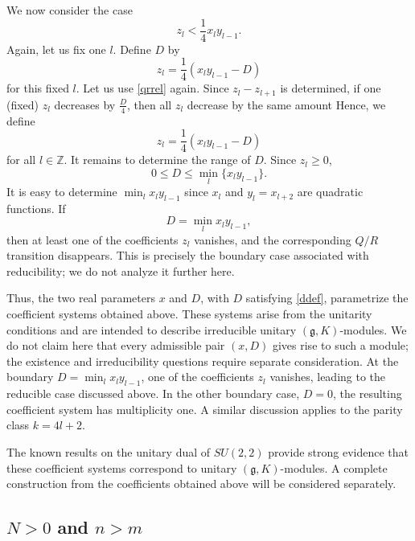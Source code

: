 \documentclass[twoside,a4paper,12pt]{article}
\newcommand{\g}{\ensuremath{\mathfrak g}}
\newcommand{\Z}{\ensuremath{\mathbb Z}}
\theoremstyle{definition}
\begin{document}
We now consider the case
\begin{equation*}
	z_l<\frac14x_ly_{l-1}.
\end{equation*}
Again, let us fix one $l$. Define $D$ by
\begin{equation*}
	z_l=\frac14\left(x_ly_{l-1}-D\right)
\end{equation*}
for this fixed $l$. Let us use \eqref{qrrel} again. Since $z_l-z_{l+1}$ is
determined, if one (fixed) $z_l$ decreases by $\frac D4$, then all $z_l$
decrease by the same amount Hence, we define
\begin{equation*}
	z_l=\frac14\left(x_ly_{l-1}-D\right)
\end{equation*}
for all $l\in\Z$. It remains to determine the range of $D$. Since $z_l\geq0$,
\begin{equation}\label{ddef}
	0\leq D\leq\min_l\{x_ly_{l-1}\}.
\end{equation}
It is easy to determine $\min_l{x_ly_{l-1}}$ since $x_l$ and
$y_l=x_{l+2}$ are quadratic functions. If
\[ D=\min_l{x_ly_{l-1}}, \]
then at least one of the coefficients $z_l$ vanishes, and the corresponding
$Q/R$ transition disappears. This is precisely the boundary case associated
with reducibility; we do not analyze it further here.

Thus, the two real parameters $x$ and $D$, with $D$ satisfying
\eqref{ddef}, parametrize the coefficient systems obtained above. These
systems arise from the unitarity conditions and are intended to describe
irreducible unitary $(\g,K)$-modules. We do not claim here that every
admissible pair $(x,D)$ gives rise to such a module; the existence and
irreducibility questions require separate consideration. At the boundary
$D=\min_l{x_ly_{l-1}}$, one of the coefficients $z_l$ vanishes, leading
to the reducible case discussed above. In the other boundary case, $D=0$,
the resulting coefficient system has multiplicity one. A similar discussion
applies to the parity class $k=4l+2$.

The known results on the unitary dual of $SU(2,2)$ provide strong evidence that
these coefficient systems correspond to unitary $(\g,K)$-modules. A complete
construction from the coefficients obtained above will be considered separately.



\subsection{\texorpdfstring{$N>0$ and $n>m$}
	{N greater than 0 and n greater than m}}
\end{document}
